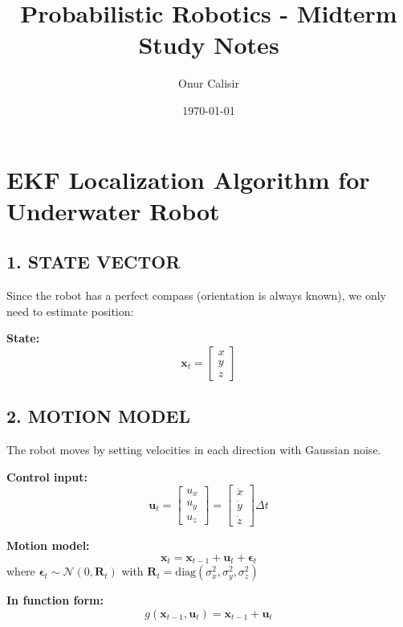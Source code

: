\documentclass[14pt,letterpaper]{article}
\title{Probabilistic Robotics - Midterm Study Notes}
\author{Onur Calisir}
\date{\today}
\theoremstyle{definition}
\begin{document}
\maketitle
\newpage

\newpage

\newpage

\newpage

\newpage

\newpage


\section*{EKF Localization Algorithm for Underwater Robot}

\subsection*{1. STATE VECTOR}

Since the robot has a perfect compass (orientation is always known), we only need to estimate position:

\textbf{State:}
\[
\mathbf{x}_t = \begin{bmatrix} x \\ y \\ z \end{bmatrix}
\]

\subsection*{2. MOTION MODEL}

The robot moves by setting velocities in each direction with Gaussian noise.

\textbf{Control input:}
\[
\mathbf{u}_t = \begin{bmatrix} u_x \\ u_y \\ u_z \end{bmatrix} = \begin{bmatrix} \dot{x} \\ \dot{y} \\ \dot{z} \end{bmatrix} \Delta t
\]

\textbf{Motion model:}
\[
\mathbf{x}_t = \mathbf{x}_{t-1} + \mathbf{u}_t + \boldsymbol{\epsilon}_t
\]
where $\boldsymbol{\epsilon}_t \sim \mathcal{N}(0, \mathbf{R}_t)$ with $\mathbf{R}_t = \text{diag}(\sigma_x^2, \sigma_y^2, \sigma_z^2)$

\textbf{In function form:}
\[
g(\mathbf{x}_{t-1}, \mathbf{u}_t) = \mathbf{x}_{t-1} + \mathbf{u}_t
\]
\end{document}
